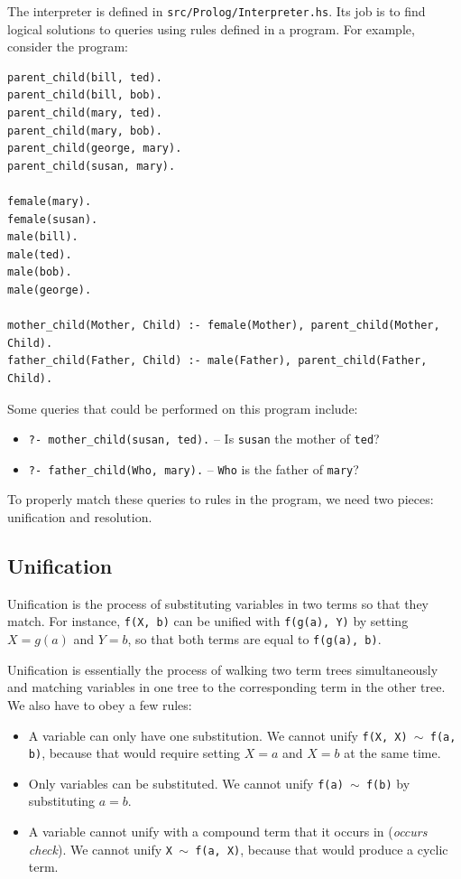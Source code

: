 \documentclass[11pt]{report}
\begin{document}
The interpreter is defined in \texttt{src/Prolog/Interpreter.hs}. Its job is to find logical solutions to queries using rules defined in a program. For example, consider the program:
\begin{verbatim}
parent_child(bill, ted).
parent_child(bill, bob).
parent_child(mary, ted).
parent_child(mary, bob).
parent_child(george, mary).
parent_child(susan, mary).

female(mary).
female(susan).
male(bill).
male(ted).
male(bob).
male(george).

mother_child(Mother, Child) :- female(Mother), parent_child(Mother, Child).
father_child(Father, Child) :- male(Father), parent_child(Father, Child).
\end{verbatim}
Some queries that could be performed on this program include:
\begin{itemize}
\item \verb|?- mother_child(susan, ted).| -- Is \texttt{susan} the mother of \texttt{ted}?
\item \verb|?- father_child(Who, mary).| -- \texttt{Who} is the father of \texttt{mary}?
\end{itemize}
To properly match these queries to rules in the program, we need two pieces: unification and resolution.

\subsection{Unification}

Unification is the process of substituting variables in two terms so that they match. For instance, \texttt{f(X, b)} can be unified with \texttt{f(g(a), Y)} by setting $X = g(a)$ and $Y = b$, so that both terms are equal to \texttt{f(g(a), b)}.

Unification is essentially the process of walking two term trees simultaneously and matching variables in one tree to the corresponding term in the other tree. We also have to obey a few rules:
\begin{itemize}
\item A variable can only have one substitution. We cannot unify \texttt{f(X, X) $\sim$ f(a, b)}, because that would require setting $X = a$ and $X = b$ at the same time.
\item Only variables can be substituted. We cannot unify \texttt{f(a) $\sim$ f(b)} by substituting $a = b$.
\item A variable cannot unify with a compound term that it occurs in (\emph{occurs check}). We cannot unify \texttt{X $\sim$ f(a, X)}, because that would produce a cyclic term.
\end{itemize}
\end{document}
